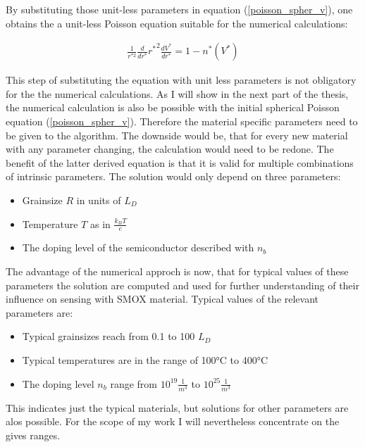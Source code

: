 \documentclass[11pt]{article}
\providecommand{\tightlist}{%
      \setlength{\itemsep}{0pt}\setlength{\parskip}{0pt}}
\begin{document}
By substituting those unit-less parameters in equation
(\ref{poisson_spher_v}), one obtains the a unit-less Poisson equation
suitable for the numerical calculations:

\begin{align}
\frac{1}{r^{*2}}\frac{d}{dr^{*}}{r^{*}}^{2}\frac{dV^{*}}{dr^{*}}=1-n^{*}(V^{*})\label{poisson_no_units}\tag{Unitless Poisson equation}
\end{align}

This step of substituting the equation with unit less parameters is not
obligatory for the the numerical calculations. As I will show in the
next part of the thesis, the numerical calculation is also be possible
with the initial spherical Poisson equation (\ref{poisson_spher_v}).
Therefore the material specific parameters need to be given to the
algorithm. The downside would be, that for every new material with any
parameter changing, the calculation would need to be redone. The benefit
of the latter derived equation is that it is valid for multiple
combinations of intrinsic parameters. The solution would only depend on
three parameters:

\begin{itemize}
\tightlist
\item
  Grainsize \(R\) in units of \(L_{D}\)
\item
  Temperature \(T\) as in \(\frac{k_{B}T}{e}\)
\item
  The doping level of the semiconductor described with \(n_b\)
\end{itemize}

The advantage of the numerical approch is now, that for typical values
of these parameters the solution are computed and used for further
understanding of their influence on sensing with SMOX material. Typical
values of the relevant parameters are:

\begin{itemize}
\tightlist
\item
  Typical grainsizes reach from 0.1 to 100 \(L_D\)
\item
  Typical temperatures are in the range of 100°C to 400°C
\item
  The doping level \(n_b\) range from \(10^{19}\frac{1}{m^3}\) to
  \(10^{25}\frac{1}{m^3}\)
\end{itemize}

This indicates just the typical materials, but solutions for other
parameters are alos possible. For the scope of my work I will
nevertheless concentrate on the gives ranges.
\end{document}
